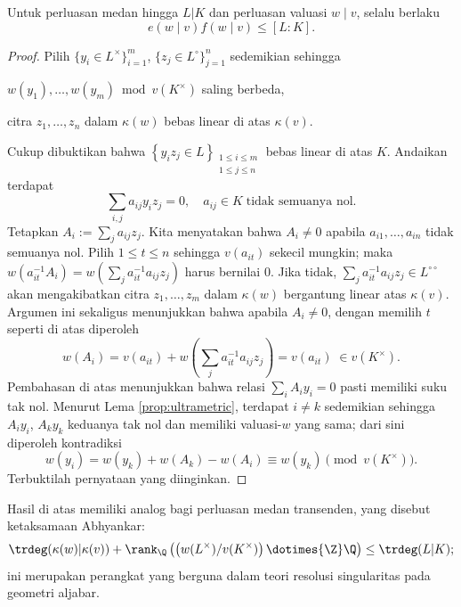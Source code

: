 \begin{proposition}\label{prop:fundamental-ineq}
	Untuk perluasan medan hingga $L|K$ dan perluasan valuasi $w \mid v$, selalu berlaku
	\[ e(w \mid v) f(w \mid v) \leq [L:K]. \]
\end{proposition}
\begin{proof}
	Pilih $\{y_i \in L^\times\}_{i=1}^m$, $\{z_j \in L^\circ \}_{j=1}^n$ sedemikian sehingga
	\begin{compactitem}
		\item $w(y_1), \ldots, w(y_m) \bmod v(K^\times)$ saling berbeda,
		\item citra $z_1, \ldots, z_n$ dalam $\kappa(w)$ bebas linear di atas $\kappa(v)$.
	\end{compactitem}
	Cukup dibuktikan bahwa $\left\{ y_i z_j \in L \right\}_{\substack{1 \leq i \leq m \\ 1 \leq j \leq n}}$ bebas linear di atas $K$. Andaikan terdapat
	\[ \sum_{i,j} a_{ij} y_i z_j = 0, \quad a_{ij} \in K\; \text{tidak semuanya nol}. \]
	Tetapkan $A_i := \sum_j a_{ij} z_j$. Kita menyatakan bahwa $A_i \neq 0$ apabila $a_{i1}, \ldots, a_{in}$ tidak semuanya nol. Pilih $1 \leq t \leq n$ sehingga $v(a_{it})$ sekecil mungkin; maka $w\left( a_{it}^{-1} A_i \right) = w\left( \sum_j a_{it}^{-1} a_{ij} z_j \right)$ harus bernilai $0$. Jika tidak, $\sum_j a_{it}^{-1} a_{ij} z_j \in L^{\circ\circ}$ akan mengakibatkan citra $z_1, \ldots, z_m$ dalam $\kappa(w)$ bergantung linear atas $\kappa(v)$. Argumen ini sekaligus menunjukkan bahwa apabila $A_i \neq 0$, dengan memilih $t$ seperti di atas diperoleh
	\[ w(A_i) = v(a_{it}) + w\left( \sum_j a_{it}^{-1} a_{ij} z_j \right) = v(a_{it}) \;\in v(K^\times). \]
	Pembahasan di atas menunjukkan bahwa relasi $\sum_i A_i y_i = 0$ pasti memiliki suku tak nol. Menurut Lema \ref{prop:ultrametric}, terdapat $i \neq k$ sedemikian sehingga $A_i y_i$, $A_k y_k$ keduanya tak nol dan memiliki valuasi-$w$ yang sama; dari sini diperoleh kontradiksi
	\[ w(y_i) = w(y_k) + w(A_k) - w(A_i) \equiv w(y_k) \pmod {v(K^\times)}. \]
	Terbuktilah pernyataan yang diinginkan.
\end{proof}

Hasil di atas memiliki analog bagi perluasan medan transenden, yang disebut ketaksamaan Abhyankar:
\[ \trdeg(\kappa(w)|\kappa(v)) + \rank_{\Q}\left( \left(w(L^\times) / v(K^\times)\right) \dotimes{\Z} \Q \right) \leq \trdeg(L|K); \]
ini merupakan perangkat yang berguna dalam teori resolusi singularitas pada geometri aljabar.

